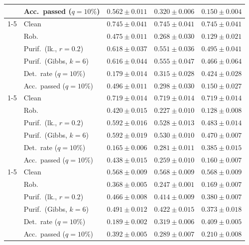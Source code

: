 \begin{table}[htbp]
\begin{tabular}{@{}llrrr@{}}
     & Acc.\ passed ($q{=}10\%$) & $0.562 \pm 0.011$ & $0.320 \pm 0.006$ & $0.150 \pm 0.004$ \\
    \cmidrule(lr){1-5}
    \multirow{6}{*}{$\alpha{=}0.2$} & Clean & $0.745 \pm 0.041$ & $0.745 \pm 0.041$ & $0.745 \pm 0.041$ \\
     & Rob. & $0.475 \pm 0.011$ & $0.268 \pm 0.030$ & $0.129 \pm 0.021$ \\
     & Purif.\ (lk., $r{=}0.2$) & $0.618 \pm 0.037$ & $0.551 \pm 0.036$ & $0.495 \pm 0.041$ \\
     & Purif.\ (Gibbs, $k{=}6$) & $0.616 \pm 0.044$ & $0.555 \pm 0.047$ & $0.466 \pm 0.064$ \\
     & Det.\ rate ($q{=}10\%$) & $0.179 \pm 0.014$ & $0.315 \pm 0.028$ & $0.424 \pm 0.028$ \\
     & Acc.\ passed ($q{=}10\%$) & $0.496 \pm 0.011$ & $0.298 \pm 0.030$ & $0.150 \pm 0.027$ \\
    \cmidrule(lr){1-5}
    \multirow{6}{*}{$\alpha{=}0.5$} & Clean & $0.719 \pm 0.014$ & $0.719 \pm 0.014$ & $0.719 \pm 0.014$ \\
     & Rob. & $0.420 \pm 0.015$ & $0.227 \pm 0.010$ & $0.128 \pm 0.008$ \\
     & Purif.\ (lk., $r{=}0.2$) & $0.592 \pm 0.016$ & $0.528 \pm 0.013$ & $0.483 \pm 0.014$ \\
     & Purif.\ (Gibbs, $k{=}6$) & $0.592 \pm 0.019$ & $0.530 \pm 0.010$ & $0.470 \pm 0.007$ \\
     & Det.\ rate ($q{=}10\%$) & $0.165 \pm 0.006$ & $0.281 \pm 0.011$ & $0.385 \pm 0.015$ \\
     & Acc.\ passed ($q{=}10\%$) & $0.438 \pm 0.015$ & $0.259 \pm 0.010$ & $0.160 \pm 0.007$ \\
    \cmidrule(lr){1-5}
    \multirow{6}{*}{$\alpha{=}1$} & Clean & $0.568 \pm 0.009$ & $0.568 \pm 0.009$ & $0.568 \pm 0.009$ \\
     & Rob. & $0.368 \pm 0.005$ & $0.247 \pm 0.001$ & $0.169 \pm 0.007$ \\
     & Purif.\ (lk., $r{=}0.2$) & $0.466 \pm 0.008$ & $0.414 \pm 0.009$ & $0.380 \pm 0.007$ \\
     & Purif.\ (Gibbs, $k{=}6$) & $0.491 \pm 0.012$ & $0.422 \pm 0.015$ & $0.373 \pm 0.018$ \\
     & Det.\ rate ($q{=}10\%$) & $0.189 \pm 0.002$ & $0.319 \pm 0.006$ & $0.409 \pm 0.005$ \\
     & Acc.\ passed ($q{=}10\%$) & $0.392 \pm 0.005$ & $0.289 \pm 0.007$ & $0.210 \pm 0.008$ \\

\end{tabular}
\end{table}
